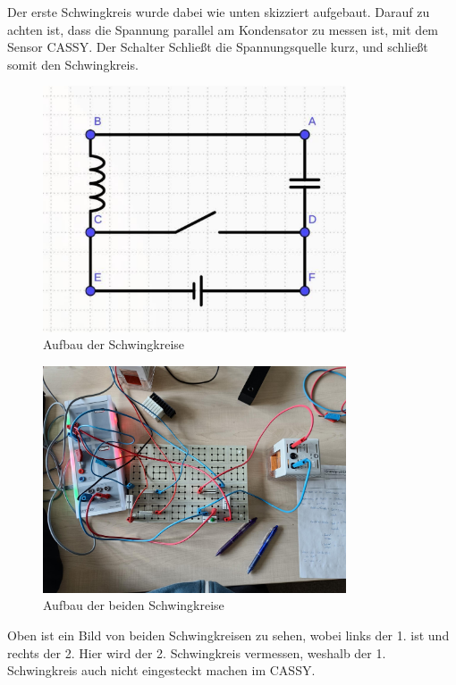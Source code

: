 \documentclass[twoside]{protokoll}
\begin{document}
Der erste Schwingkreis wurde dabei wie unten skizziert aufgebaut.
Darauf zu achten ist, dass die Spannung parallel am Kondensator zu messen ist, mit dem Sensor CASSY. Der Schalter Schließt die Spannungsquelle kurz, und schließt somit den Schwingkreis.
\begin{figure}[H]
    \centering
    \includegraphics[width=0.8\textwidth]{schaltplan-einzelschwingkreis.pdf}
    \caption{Aufbau der Schwingkreise}
\end{figure}
\begin{figure}[H]
    \centering
    \includegraphics[width=0.8\textwidth]{bilder/schwingkreis2.pdf}
    \caption{Aufbau der beiden Schwingkreise}
\end{figure}

Oben ist ein Bild von beiden Schwingkreisen zu sehen, wobei links der 1. ist und rechts der 2.
Hier wird der 2. Schwingkreis vermessen, weshalb der 1. Schwingkreis auch nicht eingesteckt machen im CASSY.
 
\end{document}
